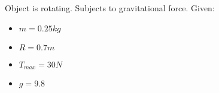 

Object is rotating. Subjects to gravitational force.
Given: 

\begin{itemize}
    \item $  m  = 0.25kg $
    \item $ R = 0.7m $
    \item $ T_{max} = 30N $
    \item $ g = 9.8 $
\end{itemize}
